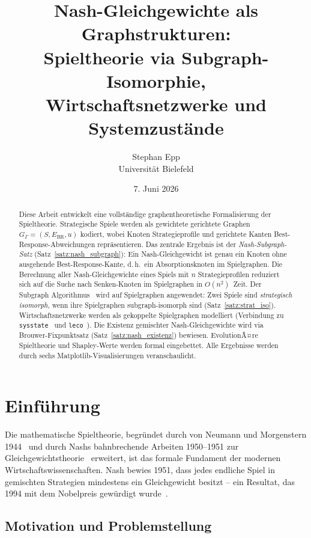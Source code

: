 ﻿\documentclass[a4paper,12pt]{article}
\title{Nash-Gleichgewichte als Graphstrukturen:\\
Spieltheorie via Subgraph-Isomorphie,\\
Wirtschaftsnetzwerke und Systemzust\"ande}
\author{Stephan Epp\\[4pt]
\small Universit\"at Bielefeld}
\date{7. Juni 2026}
\theoremstyle{definition}
\begin{document}
\maketitle

\begin{abstract}
Diese Arbeit entwickelt eine vollst\"andige graphentheoretische Formalisierung
der Spieltheorie. Strategische Spiele werden als gewichtete gerichtete Graphen
$G_\Gamma = (S, E_{\mathrm{BR}}, u)$ kodiert, wobei Knoten Strategieprofile
und gerichtete Kanten Best-Response-Abweichungen repr\"asentieren.
Das zentrale Ergebnis ist der \emph{Nash-Subgraph-Satz} (Satz~\ref{satz:nash_subgraph}):
Ein Nash-Gleichgewicht ist genau ein Knoten ohne ausgehende Best-Response-Kante,
d.\,h.\ ein Absorptionsknoten im Spielgraphen. Die Berechnung aller Nash-Gleichgewichte
eines Spiels mit $n$ Strategieprofilen reduziert sich auf die Suche nach
Senken-Knoten im Spielgraphen in $O(n^2)$~Zeit.
Der Subgraph Algorithmus~\cite{epp2026subgraph} wird auf Spielgraphen angewendet:
Zwei Spiele sind \emph{strategisch isomorph}, wenn ihre Spielgraphen
subgraph-isomorph sind (Satz~\ref{satz:strat_iso}).
Wirtschaftsnetzwerke werden als gekoppelte Spielgraphen modelliert
(Verbindung zu \texttt{sysstate}~\cite{epp2026sysstate} und
\texttt{leco}~\cite{epp2026leco}).
Die Existenz gemischter Nash-Gleichgewichte wird via Brouwer-Fixpunktsatz
(Satz~\ref{satz:nash_existenz}) bewiesen.
EvolutionÃ¤re Spieltheorie und Shapley-Werte werden formal eingebettet.
Alle Ergebnisse werden durch sechs Matplotlib-Visualisierungen veranschaulicht.
\end{abstract}

\tableofcontents
\newpage

\section{Einf\"uhrung}

Die mathematische Spieltheorie, begr\"undet durch von Neumann und Morgenstern
1944~\cite{vonneumann1944} und durch Nashs bahnbrechende Arbeiten 1950--1951
zur Gleichgewichtstheorie~\cite{nash1950,nash1951} erweitert, ist das formale
Fundament der modernen Wirtschaftswissenschaften. Nash bewies 1951, dass jedes
endliche Spiel in gemischten Strategien mindestens ein Gleichgewicht besitzt --
ein Resultat, das 1994 mit dem Nobelpreis gew\"urdigt wurde~\cite{nobel1994}.

\subsection{Motivation und Problemstellung}
\end{document}
